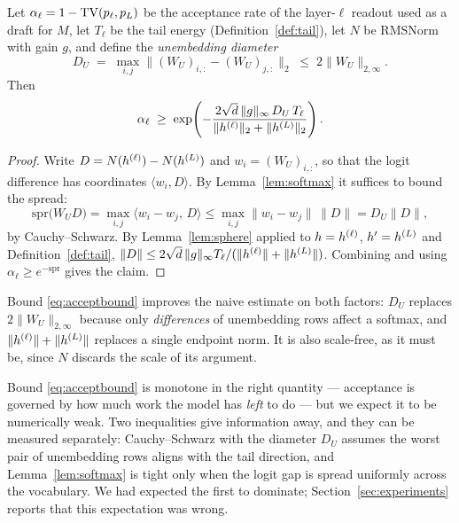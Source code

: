 \begin{theorem}
\label{thm:accept}
Let $\alpha_\ell = 1 - \mathrm{TV}(p_\ell,p_L)$ be the acceptance rate of the layer-$\ell$
readout used as a draft for $M$, let $T_\ell$ be the tail energy
(Definition~\ref{def:tail}), let $N$ be RMSNorm with gain $g$, and define the
\emph{unembedding diameter}
\begin{equation}
  D_U \;=\; \max_{i,j} \big\| (W_U)_{i,:} - (W_U)_{j,:} \big\|_2
  \;\le\; 2\|W_U\|_{2,\infty} .
\end{equation}
Then
\begin{equation}
  \alpha_\ell \;\ge\;
  \exp\!\left( - \frac{2\sqrt d\,\|g\|_\infty\, D_U\, T_\ell}
                     {\|h^{(\ell)}\|_2 + \|h^{(L)}\|_2} \right) .
  \label{eq:acceptbound}
\end{equation}
\end{theorem}

\begin{proof}
Write $D = N(h^{(\ell)}) - N(h^{(L)})$ and $w_i = (W_U)_{i,:}$, so that the logit
difference has coordinates $\langle w_i, D\rangle$. By
Lemma~\ref{lem:softmax} it suffices to bound the spread:
\begin{equation}
  \mathrm{spr}\big(W_U D\big)
  = \max_{i,j} \langle w_i - w_j,\, D\rangle
  \le \max_{i,j}\|w_i - w_j\|\,\|D\|
  = D_U \|D\| ,
\end{equation}
by Cauchy--Schwarz. By Lemma~\ref{lem:sphere} applied to
$h = h^{(\ell)}$, $h' = h^{(L)}$ and Definition~\ref{def:tail},
$\|D\| \le 2\sqrt d\,\|g\|_\infty T_\ell / (\|h^{(\ell)}\| + \|h^{(L)}\|)$.
Combining and using $\alpha_\ell \ge e^{-\mathrm{spr}}$ gives the claim.
\end{proof}

\begin{remark}
Bound \eqref{eq:acceptbound} improves the naive estimate on both factors: $D_U$
replaces $2\|W_U\|_{2,\infty}$ because only \emph{differences} of unembedding
rows affect a softmax, and $\|h^{(\ell)}\|+\|h^{(L)}\|$ replaces a single endpoint
norm. It is also scale-free, as it must be, since $N$ discards the scale of its
argument.
\end{remark}

\begin{remark}
\label{rem:loose}
Bound \eqref{eq:acceptbound} is monotone in the right quantity --- acceptance is
governed by how much work the model has \emph{left} to do --- but we expect it to
be numerically weak. Two inequalities give information away, and they can be
measured separately: Cauchy--Schwarz with the diameter $D_U$ assumes the worst
pair of unembedding rows aligns with the tail direction, and
Lemma~\ref{lem:softmax} is tight only when the logit gap is spread uniformly
across the vocabulary. We had expected the first to dominate;
Section~\ref{sec:experiments} reports that this expectation was wrong.
\end{remark}

